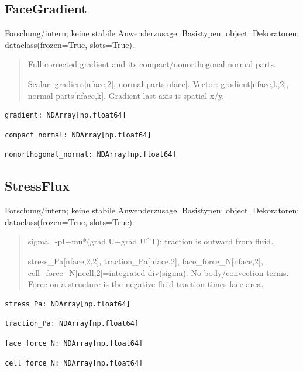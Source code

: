 \subsection{FaceGradient}
Forschung/intern; keine stabile Anwenderzusage.
Basistypen: object. Dekoratoren: dataclass(frozen=True, slots=True).
\begin{quote}
Full corrected gradient and its compact/nonorthogonal normal parts.\par Scalar: gradient[nface,2], normal parts[nface]. Vector: gradient[nface,k,2], normal parts[nface,k]. Gradient last axis is spatial x/y.
\end{quote}
\begin{lstlisting}
gradient: NDArray[np.float64]
\end{lstlisting}
\begin{lstlisting}
compact_normal: NDArray[np.float64]
\end{lstlisting}
\begin{lstlisting}
nonorthogonal_normal: NDArray[np.float64]
\end{lstlisting}
\subsection{StressFlux}
Forschung/intern; keine stabile Anwenderzusage.
Basistypen: object. Dekoratoren: dataclass(frozen=True, slots=True).
\begin{quote}
sigma=-pI+mu*(grad U+grad U\textasciicircum{}T); traction is outward from fluid.\par stress\_Pa[nface,2,2], traction\_Pa[nface,2], face\_force\_N[nface,2], cell\_force\_N[ncell,2]=integrated div(sigma). No body/convection terms. Force on a structure is the negative fluid traction times face area.
\end{quote}
\begin{lstlisting}
stress_Pa: NDArray[np.float64]
\end{lstlisting}
\begin{lstlisting}
traction_Pa: NDArray[np.float64]
\end{lstlisting}
\begin{lstlisting}
face_force_N: NDArray[np.float64]
\end{lstlisting}
\begin{lstlisting}
cell_force_N: NDArray[np.float64]
\end{lstlisting}
